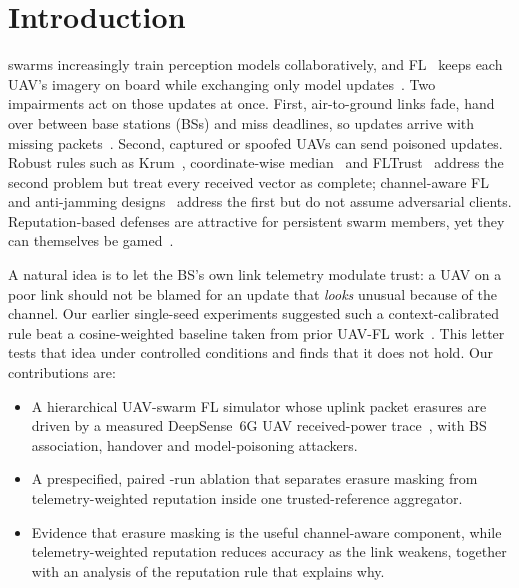 \documentclass[journal]{IEEEtran}
\begin{document}
\section{Introduction}
 swarms increasingly train perception models collaboratively,
and FL~\cite{mcmahan2017fedavg} keeps each UAV's imagery on board while exchanging
only model updates~\cite{xiao2021uavswarm}. Two impairments act on those updates at
once. First, air-to-ground links fade, hand over between base stations (BSs) and
miss deadlines, so updates arrive with missing packets~\cite{shirvanimoghaddam2022erroneous}.
Second, captured or spoofed UAVs can send poisoned updates. Robust rules such as
Krum~\cite{blanchard2017krum}, coordinate-wise median~\cite{yin2018median} and
FLTrust~\cite{cao2021fltrust} address the second problem but treat every received
vector as complete; channel-aware FL and anti-jamming designs~\cite{barkatsa2024jamming}
address the first but do not assume adversarial clients. Reputation-based defenses are
attractive for persistent swarm members, yet they can themselves be gamed~\cite{liu2026evade}.

A natural idea is to let the BS's own link telemetry modulate trust: a UAV on a
poor link should not be blamed for an update that \emph{looks} unusual because of
the channel. Our earlier single-seed experiments suggested such a context-calibrated
rule beat a cosine-weighted baseline taken from prior UAV-FL work~\cite{liao2023tee}.
This letter tests that idea under controlled conditions and finds that it does not hold.
Our contributions are:
\begin{itemize}
\item A hierarchical UAV-swarm FL simulator whose uplink packet erasures are driven by
  a measured DeepSense~6G UAV received-power trace~\cite{alkhateeb2023deepsense}, with
  BS association, handover and model-poisoning attackers.
\item A prespecified, paired \NumRuns-run ablation that separates erasure masking from
  telemetry-weighted reputation inside one trusted-reference aggregator.
\item Evidence that erasure masking is the useful channel-aware component, while
  telemetry-weighted reputation reduces accuracy as the link weakens, together with
  an analysis of the reputation rule that explains why.
\end{itemize}
\end{document}
